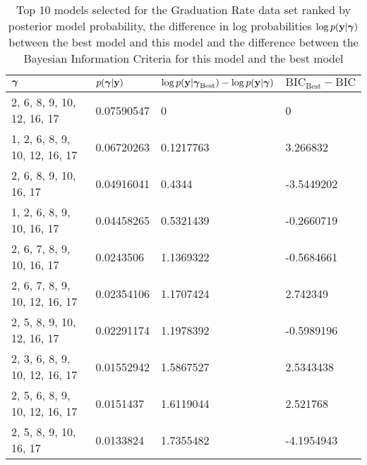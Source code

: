 \documentclass{amsart}
\begin{document}
\begin{table}
\label{tab:numerical_results_gradrate}
\caption{Top 10 models selected for the Graduation Rate data set ranked by posterior model probability, the
					difference in log probabilities $\log p({\bf y}|{\boldsymbol \gamma})$ between the best model and this model and the difference between the Bayesian Information Criteria for this model and the best model}
\begin{tabular}{|l|lll|}
\hline
${\boldsymbol \gamma}$ & $p({\boldsymbol \gamma}|{\bf y})$ & $\log p({\bf y} | {\boldsymbol \gamma}_\text{Best}) - \log p({\bf y} | {\boldsymbol \gamma})$ & $\text{BIC}_\text{Best} - \text{BIC}$ \\
\hline
2, 6, 8, 9, 10, 12, 16, 17 & 0.07590547 & 0 & 0 \\
1, 2, 6, 8, 9, 10, 12, 16, 17 & 0.06720263 & 0.1217763 & 3.266832 \\
2, 6, 8, 9, 10, 16, 17 & 0.04916041 & 0.4344 & -3.5449202 \\
1, 2, 6, 8, 9, 10, 16, 17 & 0.04458265 & 0.5321439 & -0.2660719 \\
2, 6, 7, 8, 9, 10, 16, 17 & 0.0243506 & 1.1369322 & -0.5684661 \\
2, 6, 7, 8, 9, 10, 12, 16, 17 & 0.02354106 & 1.1707424 & 2.742349 \\
2, 5, 8, 9, 10, 12, 16, 17 & 0.02291174 & 1.1978392 & -0.5989196 \\
2, 3, 6, 8, 9, 10, 12, 16, 17 & 0.01552942 & 1.5867527 & 2.5343438 \\
2, 5, 6, 8, 9, 10, 12, 16, 17 & 0.0151437 & 1.6119044 & 2.521768 \\
2, 5, 8, 9, 10, 16, 17 & 0.0133824 & 1.7355482 & -4.1954943 \\
\hline
\end{tabular}
\end{table}
\end{document}
